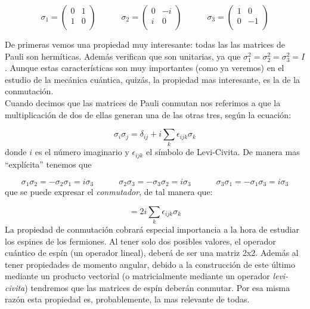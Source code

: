 \documentclass[12pt,a4paper]{book}
\numberwithin{equation}{chapter}
\numberwithin{figure}{chapter}
\newcommand{\tquad}{\quad \quad \quad}
\begin{document}
\begin{equation}
\sigma_1 = \begin{pmatrix}
0 & 1 \\
1 & 0 \\ 
\end{pmatrix} \tquad 
\sigma_2 = \begin{pmatrix}
0 & -i \\
i & 0 \\ 
\end{pmatrix} \tquad
\sigma_3 = \begin{pmatrix}
1 & 0 \\
0 & -1 \\ 
\end{pmatrix}
\end{equation}

De primeras vemos una propiedad muy interesante: todas las las matrices de Pauli son hermíticas. Además verifican que son unitarias, ya que $\sigma_1^2 = \sigma_2^2 = \sigma_3^2=I$. Aunque estas características son muy importantes (como ya veremos) en el estudio de la mecánica cuántica, quizás, la propiedad mas interesante, es la de la conmutación. \\

Cuando decimos que las matrices de Pauli conmutan nos referimos a que la multiplicación de dos de ellas generan una de las otras tres, según la ecuación:

\begin{equation}
\sigma_i \sigma_j = \delta_{ij} + i \sum_k \epsilon_{ijk} \sigma_k
\end{equation}
donde $i$ es el número imaginario y $\epsilon_{ijk}$ el símbolo de Levi-Civita. De manera mas ``explícita'' tenemos que

\begin{equation}
\sigma_1 \sigma_2 = - \sigma_2 \sigma_1 = i \sigma_3  \tquad 
\sigma_2 \sigma_3 = - \sigma_3 \sigma_2 = i \sigma_3  \tquad
\sigma_3 \sigma_1 = - \sigma_1 \sigma_3 = i \sigma_3 
\end{equation}
que se puede expresar el \textit{conmutador}, de tal manera que:

\begin{equation}
[\sigma_i, \sigma_j] = 2 i \sum_{k} \epsilon_{ijk} \sigma_k
\end{equation}
La propiedad de conmutación cobrará especial importancia a la hora de estudiar los espines de los fermiones. Al tener solo dos posibles valores, el operador cuántico de espín (un operador lineal), deberá de ser una matriz 2x2. Además al tener propiedades de momento angular, debido a la construcción de este último mediante un producto vectorial (o matricialmente mediante un operador \textit{levi-civita}) tendremos que las matrices de espín deberán conmutar. Por esa misma razón esta propiedad es, probablemente, la mas relevante de todas. \\
\end{document}
